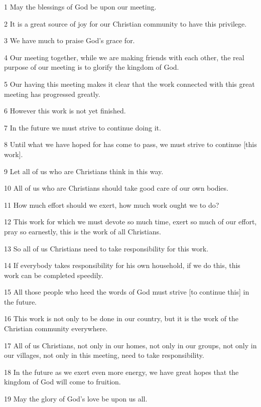 
1 May the blessings of God be upon our meeting.

2 It is a great source of joy for our Christian community to have this privilege.

3 We have much to praise God's grace for.

4 Our meeting together, while we are making friends with each other, the real purpose
of our meeting is to glorify the kingdom of God.

5 Our having this meeting makes it clear that the work connected with this great
meeting has progressed greatly.

6 However this work is not yet finished.

7 In the future we must strive to continue doing it.

8 Until what we have hoped for has come to pass, we must strive to continue [this
work].

9 Let all of us who are Christians think in this way.

10 All of us who are Christians should take good care of our own bodies.

11 How much effort should we exert, how much work ought we to do?

12 This work for which we must devote so much time, exert so much of our effort,
pray so earnestly, this is the work of all Christians.

13 So all of us Christians need to take responsibility for this work.

14 If everybody takes responsibility for his own household, if we do this, this
work can be completed speedily.

15 All those people who heed the words of God must strive [to continue this] in
the future.

16 This work is not only to be done in our country, but it is the work of the Christian
community everywhere.

17 All of us Christians, not only in our homes, not only in our groups, not only
in our villages, not only in this meeting, need to take responsibility.

18 In the future as we exert even more energy, we have great hopes that the kingdom
of God will come to fruition.

19 May the glory of God's love be upon us all.


